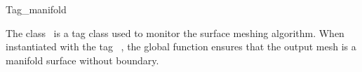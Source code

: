 

\begin{ccRefClass}{Tag_manifold}  %


\ccDefinition
  
The class \ccRefName\ is a tag class used to monitor the
surface meshing algorithm. When instantiated with the tag
\ccRefName\ , the global function 
ensures that the output mesh  is a  manifold surface
without boundary.











\ccSeeAlso

\\
 \\





\end{ccRefClass}


